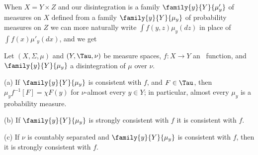\medskip

 When $X=Y\times Z$ and our disintegration is a
family $\family{y}{Y}{\mu'_y}$ of measures on $X$ defined from a family
$\family{y}{Y}{\mu_y}$ of probability measures
on $Z$ we can more naturally write
$\int f(y,z)\mu_y(dz)$ in place of $\int f(x)\mu'_y(dx)$, and we get



 Let $(X,\Sigma,\mu)$ and $(Y,\Tau,\nu)$ be
measure spaces, $f:X\to Y$ an \imp\ function, and $\family{y}{Y}{\mu_y}$
a disintegration of $\mu$ over $\nu$.

(a) If $\family{y}{Y}{\mu_y}$ is consistent with $f$, and $F\in\Tau$,
then $\mu_yf^{-1}[F]=\chi F(y)$ for $\nu$-almost every $y\in Y$;  in
particular, almost every $\mu_y$ is a probability measure.

(b) If $\family{y}{Y}{\mu_y}$ is strongly consistent with $f$ it is
consistent with $f$.

(c) If $\nu$ is countably separated and
$\family{y}{Y}{\mu_y}$ is consistent with $f$, then it is strongly
consistent with $f$.


